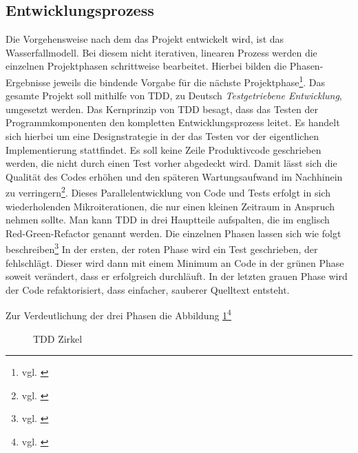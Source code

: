 \subsection{Entwicklungsprozess}
\label{sec:Entwicklungsprozess}
Die Vorgehensweise nach dem das Projekt entwickelt wird, ist das Wasserfallmodell.
Bei diesem nicht iterativen, linearen Prozess werden die einzelnen Projektphasen schrittweise bearbeitet. Hierbei bilden die Phasen-Ergebnisse jeweils die bindende Vorgabe für die nächste Projektphase\footnote{vgl. \cite[S. 263]{ItHandbuch}}.
Das gesamte Projekt soll mithilfe von \ac{TDD}, zu Deutsch \textit{Testgetriebene Entwicklung}, umgesetzt werden. Das Kernprinzip von \ac{TDD} besagt, dass das Testen der Programmkomponenten den kompletten Entwicklungsprozess leitet.
Es handelt sich hierbei um eine Designstrategie in der das Testen vor der eigentlichen Implementierung stattfindet. Es soll keine Zeile Produktivcode geschrieben werden, die nicht durch einen Test vorher abgedeckt wird.
Damit lässt sich die Qualität des Codes erhöhen und den späteren Wartungsaufwand im Nachhinein zu verringern\footnote{vgl. \cite{datenschutzbeauftragter}}.
Dieses Parallelentwicklung von Code und Tests erfolgt in sich wiederholenden Mikroiterationen, die nur einen kleinen Zeitraum in Anspruch nehmen sollte. Man kann \acs{TDD} in drei Hauptteile aufspalten, die im englisch Red-Green-Refactor genannt werden. 
Die einzelnen Phasen lassen sich wie folgt beschreiben\footnote{vgl. \cite{tddwiki}}
In der ersten, der roten Phase wird ein Test geschrieben, der fehlschlägt. Dieser wird dann mit einem Minimum an Code in der grünen Phase soweit verändert, dass er erfolgreich durchläuft. In der letzten grauen Phase wird der Code refaktorisiert, dass einfacher, sauberer Quelltext entsteht. 

Zur Verdeutlichung der drei Phasen die Abbildung \ref{fig:tddcircle}\footnote{vgl. \cite{tddcircle}}
\begin{figure}[htb!]
\centering
{}
\caption{TDD Zirkel}
\label{fig:tddcircle}%
\end{figure}